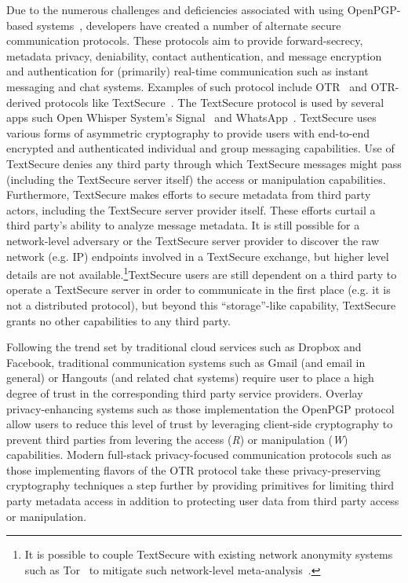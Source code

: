 Due to the numerous challenges and deficiencies associated with using
OpenPGP-based systems~\cite{green-pgp, borisov2004, whitten1999},
developers have created a number of alternate secure communication
protocols. These protocols aim to provide forward-secrecy, metadata
privacy, deniability, contact authentication, and message encryption
and authentication for (primarily) real-time communication such as
instant messaging and chat systems. Examples of such protocol include
OTR~\cite{otr-v3} and OTR-derived protocols like
TextSecure~\cite{otr-advanced-ratchet}. The TextSecure protocol is
used by several apps such Open Whisper System's
Signal~\cite{openwhisper} and WhatsApp~\cite{whatsapp}. TextSecure
uses various forms of asymmetric cryptography to provide users with
end-to-end encrypted and authenticated individual and group messaging
capabilities. Use of TextSecure denies any third party through which
TextSecure messages might pass (including the TextSecure server
itself) the access or manipulation capabilities. Furthermore,
TextSecure makes efforts to secure metadata from third party actors,
including the TextSecure server provider itself. These efforts curtail
a third party's ability to analyze message metadata. It is still
possible for a network-level adversary or the TextSecure server
provider to discover the raw network (e.g. IP) endpoints involved in a
TextSecure exchange, but higher level details are not
available.\footnote{It is possible to couple TextSecure with existing
  network anonymity systems such as Tor~\cite{dingledine2004} to
  mitigate such network-level
  meta-analysis~\cite{intercept-chatting}.}TextSecure users are still
dependent on a third party to operate a TextSecure server in order to
communicate in the first place (e.g. it is not a distributed
protocol), but beyond this ``storage''-like capability, TextSecure
grants no other capabilities to any third party.

Following the trend set by traditional cloud services such as Dropbox
and Facebook, traditional communication systems such as Gmail (and
email in general) or Hangouts (and related chat systems) require user
to place a high degree of trust in the corresponding third party
service providers. Overlay privacy-enhancing systems such as those
implementation the OpenPGP protocol allow users to reduce this level
of trust by leveraging client-side cryptography to prevent third
parties from levering the access (\emph{R}) or manipulation (\emph{W})
capabilities. Modern full-stack privacy-focused communication
protocols such as those implementing flavors of the OTR protocol take
these privacy-preserving cryptography techniques a step further by
providing primitives for limiting third party metadata access in
addition to protecting user data from third party access or
manipulation.

